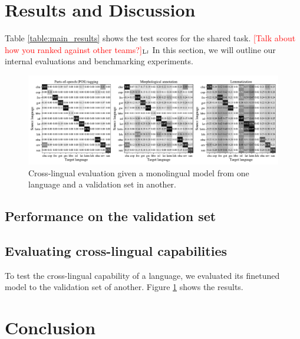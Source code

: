 \documentclass[11pt]{article}
\newcommand{\draftonly}[1]{#1}
\newcommand{\draftcomment}[3]{\draftonly{\textcolor{#2}{[#3]{$_{\textsc{#1}}$}}}}
\newcommand{\lj}[1]{\draftcomment{Lj}{red}{#1}}
\begin{document}
\section{Results and Discussion}

Table \ref{table:main_results} shows the test scores for the shared task.
\lj{Talk about how you ranked against other teams?}
In this section, we will outline our internal evaluations and benchmarking experiments.


\begin{figure}[t]
\centering
\includegraphics[width=\textwidth]{figures/cross_lingual.pdf}
\caption{Cross-lingual evaluation given a monolingual model from one language and a validation set in another.}
\label{fig:cross_lingual}
\end{figure}


\subsection{Performance on the validation set}



\subsection{Evaluating cross-lingual capabilities}
\label{sec:results_crosslingual}

To test the cross-lingual capability of a language, we evaluated its finetuned model to the validation set of another.
Figure \ref{fig:cross_lingual} shows the results.





\section{Conclusion}
\end{document}
